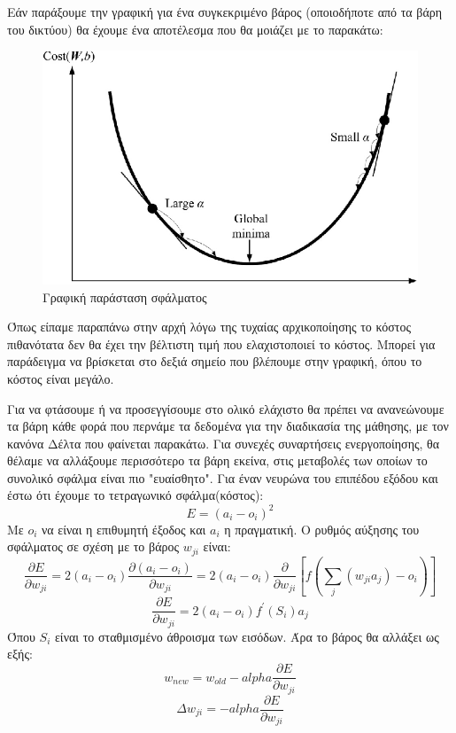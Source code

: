 Εάν παράξουμε την γραφική  για ένα συγκεκριμένο βάρος (οποιοδήποτε από
τα βάρη του δικτύου) θα έχουμε ένα αποτέλεσμα που θα μοιάζει με το παρακάτω:
\begin{figure}[H]
    \centering
    \includegraphics[width=1\textwidth]{images/weight-cost.png}
    \caption{Γραφική παράσταση σφάλματος}
\end{figure}

Όπως είπαμε παραπάνω στην αρχή λόγω της τυχαίας αρχικοποίησης το κόστος πιθανότατα
δεν θα έχει την βέλτιστη τιμή που ελαχιστοποιεί το κόστος. Μπορεί για παράδειγμα να
βρίσκεται στο δεξιά σημείο που βλέπουμε στην γραφική, όπου το κόστος είναι μεγάλο.

Για
να φτάσουμε ή να προσεγγίσουμε στο ολικό ελάχιστο θα πρέπει να ανανεώνουμε τα βάρη
κάθε φορά που περνάμε τα δεδομένα για την διαδικασία της μάθησης, με τον κανόνα Δέλτα
που φαίνεται παρακάτω. Για συνεχές συναρτήσεις ενεργοποίησης, θα θέλαμε να αλλάξουμε
περισσότερο τα βάρη εκείνα, στις μεταβολές των οποίων το συνολικό σφάλμα είναι πιο
"ευαίσθητο". Για έναν νευρώνα του επιπέδου εξόδου και έστω ότι έχουμε το τετραγωνικό
σφάλμα(κόστος):
$$E=(a_i-o_i)^2$$
Με $o_i$ να είναι η επιθυμητή έξοδος και $a_i$ η πραγματική.
Ο ρυθμός αύξησης του σφάλματος σε σχέση με το βάρος $w_{ji}$ είναι:
$$\frac{\partial E}{\partial w_{ji}}=2(a_i-o_i)\frac{\partial (a_i-o_i)}{\partial w_{ji}}=2(a_i-o_i)\frac{\partial}{\partial w_{ji}}\left[ f\left( \sum\limits_j(w_{ji}a_j)-o_i\right)\right]$$
$$\frac{\partial E}{\partial w_{ji}}=2(a_i-o_i)f^\prime (S_i)a_j$$
Όπου $S_i$ είναι το σταθμισμένο άθροισμα των εισόδων.
Άρα το βάρος θα αλλάξει ως εξής:
$$w_{new}=w_{old}-alpha\frac{\partial E}{\partial w_{ji}}$$
$$\Delta w_{ji}=-alpha\frac{\partial E}{\partial w_{ji}}$$

